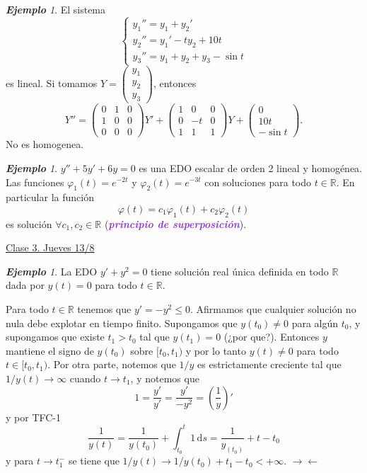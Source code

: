 \documentclass{article}
\theoremstyle{definition}
\theoremstyle{remark}
\newtheorem{example}[theorem]{\textbf{Ejemplo}}
\numberwithin{equation}{section}
\newcommand{\R}{\mathbb{R}}
\renewcommand{\d}{\mathrm{d}}
\newcommand{\vphi}{\varphi}
\newcommand{\oo}{\infty}
\newcommand{\br}[1]{\left( #1 \right)}
\newcommand{\matr}[1]{\begin{pmatrix}#1\end{pmatrix}}
\newcommand{\wea}[1]{\textcolor{BlueViolet}{\textbf{\emph{#1}}}}
\newcommand{\fecha}[1]{\begin{flushright} \underline{#1} \end{flushright}}
\begin{document}
\begin{example}
    El sistema
    \[ \begin{cases}
        y_1'' = y_1 + y_2' \\ y_2'' = y_1' - ty_2 + 10 t \\ y_3'' = y_1 + y_2 + y_3 - \sin t
    \end{cases} \]
    es lineal. Si tomamos $Y = \matr{y_1 \\ y_2 \\ y_3}$, entonces
    \[ Y'' = \matr{0&1&0 \\ 1&0&0 \\ 0&0&0} Y' + \matr{1&0&0 \\ 0&-t&0 \\ 1&1&1} Y + \matr{0 \\ 10t \\ -\sin t}. \]
    No es homogenea.
\end{example}

\begin{example}
    $y'' + 5y' + 6y = 0$ es una EDO escalar de orden 2 lineal y homogénea.
    Las funciones $\vphi_1(t) = e^{-2t}$ y $\vphi_2(t) = e^{-3t}$ con soluciones para todo $t \in \R$. En particular la función $$\vphi(t) = c_1 \vphi_1(t) + c_2 \vphi_2(t)$$ es solución $\forall c_1, c_2 \in \R$ (\wea{principio de superposición}).
\end{example}

\fecha{Clase 3. Jueves 13/8}

\begin{example}
    La EDO $y' + y^2 = 0$ tiene solución real única definida en todo $\R$ dada por $y(t) = 0$ para todo $t \in \R$.

    Para todo $t \in \R$ tenemos que $y' = - y^2 \leq 0$. Afirmamos que cualquier solución no nula debe explotar en tiempo finito. Supongamos que $y(t_0) \neq 0$ para algún $t_0$, y supongamos que existe $t_1 > t_0$ tal que $y(t_1) = 0$ (¿por que?). %
    Entonces $y$ mantiene el signo de $y(t_0)$ sobre $[t_0,t_1)$ y por lo tanto $y(t) \neq 0$ para todo $t \in [t_0,t_1)$. Por otra parte, notemos que $1/y$ es estrictamente creciente tal que $1/y(t) \to \oo$ cuando $t \to t_1$, y notemos que
    \[ 1 = \frac{y'}{y'} = \frac{y'}{-y^2} = \br{\frac{1}{y}}' \]
    y por TFC-1
    \[ \frac{1}{y(t)} = \frac{1}{y(t_0)} + \int_{t_0}^t 1 \,\d s = \frac{1}{y_(t_0)} + t - t_0 \]
    y para $t \to t_1^-$ se tiene que $1/y(t) \to 1/y(t_0) + t_1 - t_0 < +\oo$. \(\to\gets\)
\end{example}
\end{document}

